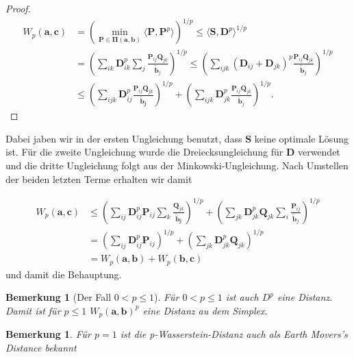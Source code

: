 \documentclass[11pt,a4paper]{article}
\newtheorem{remark}[theorem]{Bemerkung}
\numberwithin{equation}{section}
\begin{document}
\begin{proof}
	 	\begin{align}
	 		W_p(\boldsymbol{a},\boldsymbol{c}) &=\left(\min_{\boldsymbol{P \in \boldsymbol{\Pi}(\boldsymbol{a},\boldsymbol{b})}}{\langle \boldsymbol{P},\boldsymbol{P}^p \rangle}\right)^{1/p} \leq \langle \boldsymbol{S}, \boldsymbol{D}^p \rangle ^{1/p} \\
	 		&= \left( \sum_{ik}{\boldsymbol{D}_{ik}^p} \sum_j{\frac{\boldsymbol{P}_{ij}\boldsymbol{Q}_{jk}}{\tilde{\boldsymbol{b}}_j}}\right)^{1/p} \leq \left(\sum_{ijk}{(\boldsymbol{D}_{ij} + \boldsymbol{D}_{jk})^p \frac{\boldsymbol{P}_{ij}\boldsymbol{Q}_{jk}}{\tilde{\boldsymbol{b}}_j}}\right)^{1/p}\\
	 		&\leq \left(\sum_{ijk}{\boldsymbol{D}_{ij}^p}\frac{\boldsymbol{P}_{ij}\boldsymbol{Q}_{jk}}{\boldsymbol{\tilde{\boldsymbol{b}}_j}}\right)^{1/p} + \left(\sum_{ijk}{\boldsymbol{D}_{jk}^p \frac{\boldsymbol{P}_{ij}\boldsymbol{Q}_{jk}}{\tilde{\boldsymbol{b}}_j}}\right)^{1/p}.	 	\end{align}
	\end{proof}
	Dabei jaben wir in der ersten Ungleichung benutzt, dass $\boldsymbol{S}$ keine optimale Lösung ist. Für die zweite Ungleichung wurde die Dreiecksungleichung für $\boldsymbol{D}$ verwendet und die dritte Ungleichung folgt aus der Minkowski-Ungleichung.
	Nach Umstellen der beiden letzten Terme erhalten wir damit
	
	\begin{align*}
	W_p(\boldsymbol{a},\boldsymbol{c}) 
	&\leq \left(\sum_{ij}{\boldsymbol{D}_{ij}^p\boldsymbol{P}_{ij}}\sum_k{\frac{\boldsymbol{Q}_{jk}}{\boldsymbol{\tilde{\boldsymbol{b}}_j}}}\right)^{1/p} + \left(\sum_{jk}{\boldsymbol{D}_{jk}^p\boldsymbol{Q}_{jk}}\sum_i{ \frac{\boldsymbol{P}_{ij}}{\tilde{\boldsymbol{b}}_j}}\right)^{1/p}\\
	&= \left(\sum_{ij}{\boldsymbol{D}_{ij}^p\boldsymbol{P}_{ij}}\right)^{1/p}
	+
	\left(\sum_{jk}{\boldsymbol{D}_{jk}^p\boldsymbol{Q}_{jk}}\right)^{1/p}\\
	&= W_p(\boldsymbol{a},\boldsymbol{b})
	+ W_p(\boldsymbol{b},\boldsymbol{c})  
	\end{align*}
	und damit die Behauptung.
	\begin{remark}[Der Fall $0 < p \leq 1$]
		Für $0 < p \leq 1$ ist auch $D^p$ eine Distanz. Damit ist für $ p \leq 1$ $W_p(\boldsymbol{a}, \boldsymbol{b})^p$ eine Distanz au dem Simplex.
		
	\end{remark}

\begin{remark}
	Für $p=1$ ist die p-Wasserstein-Distanz auch als Earth Movers's Distance \cite{rubner2000earth} bekannt
\end{remark}
\end{document}
